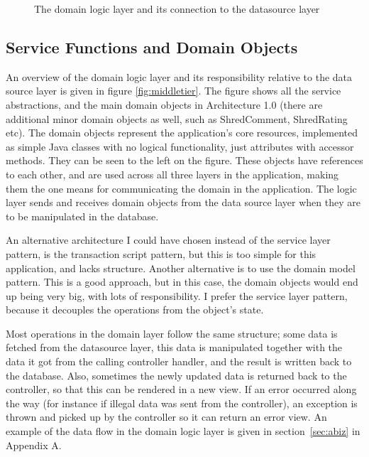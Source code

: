 \begin{figure}
		  \begin{center}
		\end{center}
		\caption{The domain logic layer and its connection to the datasource layer}\label{fig:middletier}
\end{figure}

\subsection{Service Functions and Domain Objects} 
An overview of the domain logic layer and its responsibility relative to the data source layer is given in figure \vref{fig:middletier}. The figure shows all the service abstractions, and the main domain objects in Architecture 1.0 (there are additional minor domain objects as well, such as ShredComment, ShredRating etc). The domain objects represent the application's core resources, implemented as simple Java classes with no logical functionality, just attributes with accessor methods. They can be seen to the left on the figure. These objects have references to each other, and are used across all three layers in the application, making them the one means for communicating the domain in the application. The logic layer sends and receives domain objects from the data source layer when they are to be manipulated in the database. 

An alternative architecture I could have chosen instead of the service layer pattern, is the transaction script pattern, but this is too simple for this application, and lacks structure. Another alternative is to use the domain model pattern. This is a good approach, but in this case, the domain objects would end up being very big, with lots of responsibility. I prefer the service layer pattern, because it decouples the operations from the object's state.

Most operations in the domain layer follow the same structure; some data is fetched from the datasource layer, this data is manipulated together with the data it got from the calling controller handler, and the result is written back to the database. Also, sometimes the newly updated data is returned back to the controller, so that this can be rendered in a new view. If an error occurred along the way (for instance if illegal data was sent from the controller), an exception is thrown and picked up by the controller so it can return an error view. An example of the data flow in the domain logic layer is given in section~\ref{sec:abiz} in Appendix A.

